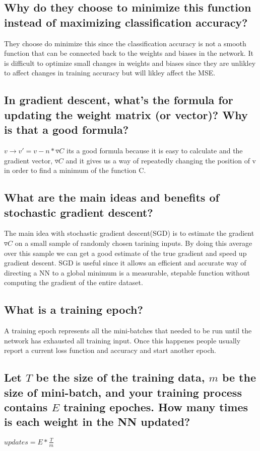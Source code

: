 \documentclass[11pt]{article}
\begin{document}
\subsection{Why do they choose to minimize this function instead of maximizing classification accuracy?}
They choose do minimize this since the classification accuracy is not a smooth function that can be connected back to the weights and biases in the network. It is difficult to optimize small changes in weights and biases since they are unlikley to affect changes in training accuracy but will likley affect the MSE.
\subsection{In gradient descent, what's the formula for updating the weight matrix (or vector)? Why is that a good formula?}
$v \rightarrow v' = v- n*\triangledown C$ its a good formula because it is easy to calculate and the gradient vector, $\triangledown C$ and it gives us a way of repeatedly changing the position of v in order to find a minimum of the function C.
\subsection{What are the main ideas and benefits of stochastic gradient descent?}
The main idea with stochastic gradient descent(SGD) is to estimate the gradient $\triangledown C$ on a small sample of randomly chosen tarining inputs. By doing this average over this sample we can get a good estimate of the true gradient and speed up gradient descent. SGD is useful since it allows an efficient and accurate way of directing a NN to a global minimum is a measurable, stepable function without computing the gradient of the entire dataset.
\subsection{What is a training epoch?}
A training epoch represents all the mini-batches that needed to be run until the network has exhausted all training input. Once this happenes people usually report a current loss function and accuracy and start another epoch.
\subsection{Let $T$ be the size of the training data, $m$ be the size of mini-batch, and your training process contains $E$ training epoches. How many times is each weight in the NN updated? }
$updates = E*\frac{T}{m}$
\end{document}
